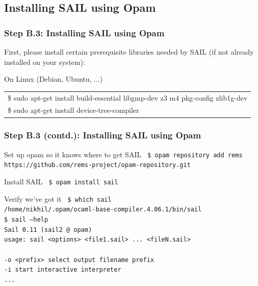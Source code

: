 \documentclass[aspectratio=169]{beamer}
\newcommand{\hm}{\hspace*{1em}}
\newcommand{\hmmm}{\hspace*{3em}}
\newcommand{\scripttt}{\scriptsize\tt}
\begin{document}

\subsection{Installing SAIL using Opam}

\begin{frame}
  \frametitle{Step B.3: Installing SAIL using Opam}

  First, please install certain prerequisite libraries needed by SAIL (if not already installed on your system):

  \begin{block}{On Linux (Debian, Ubuntu, ...)}
    \scripttt
    \begin{tabular}{l}
      \$ sudo apt-get install build-essential libgmp-dev z3 m4 pkg-config zlib1g-dev \\
      \$ sudo apt-get install device-tree-compiler \hmmm {\it Needed by simulator}
    \end{tabular}
  \end{block}

\end{frame}


\begin{frame}
  \frametitle{Step B.3 (contd.): Installing SAIL using Opam}

  \begin{block}{Set up opam so it knows where to get SAIL}
    {\scripttt
      \hm{}\$ opam repository add rems https://github.com/rems-project/opam-repository.git
    }
  \end{block}

  \begin{block}{Install SAIL}
    {\scripttt
      \hm{}\$ opam install sail \\
    }
  \end{block}

  \begin{block}{Verify we've got it}
    {\scripttt
      \hm{}\$ which sail \\
      \hm{}/home/nikhil/.opam/ocaml-base-compiler.4.06.1/bin/sail \\
      \hm{}\$ sail --help \\
      \hm{}Sail 0.11 (sail2 @ opam) \\
      \hm{}usage: sail <options> <file1.sail> ... <fileN.sail> \\
      \hm{} \\
      \hm{}  -o <prefix>                              select output filename prefix \\
      \hm{}  -i                                       start interactive interpreter \\
      \hm{}  ...
    }
  \end{block}

\end{frame}
\end{document}
